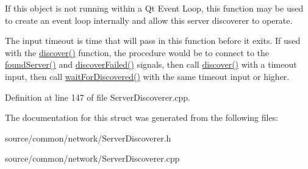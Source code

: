 If this object is not running within a Qt Event Loop, this function may be used to create an event loop internally and allow this server discoverer to operate. 

The input timeout is time that will pass in this function before it exits. If used with the \hyperlink{struct_picto_1_1_server_discoverer_afdbfa7e1d36d540892d1fae30505ca42}{discover()} function, the procedure would be to connect to the \hyperlink{struct_picto_1_1_server_discoverer_a8ed031367a6678de3d6bb828f4523c6c}{found\-Server()} and \hyperlink{struct_picto_1_1_server_discoverer_ab1d51863b7e5ae6592385212e71df9b2}{discover\-Failed()} signals, then call \hyperlink{struct_picto_1_1_server_discoverer_afdbfa7e1d36d540892d1fae30505ca42}{discover()} with a timeout input, then call \hyperlink{struct_picto_1_1_server_discoverer_a3835900b0377f135c09fdf5673c74a73}{wait\-For\-Discovered()} with the same timeout input or higher. 

Definition at line 147 of file Server\-Discoverer.\-cpp.



The documentation for this struct was generated from the following files\-:\begin{DoxyCompactItemize}
\item 
source/common/network/Server\-Discoverer.\-h\item 
source/common/network/Server\-Discoverer.\-cpp\end{DoxyCompactItemize}
